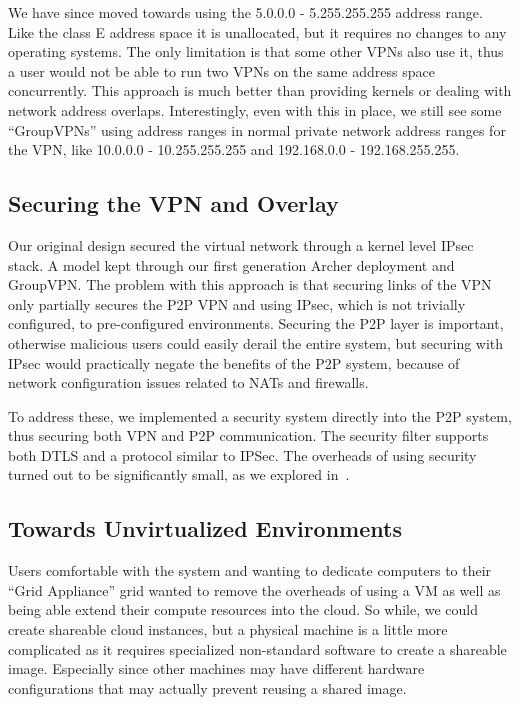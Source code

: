 \documentclass[conference]{IEEEtran}
\begin{document}
We have since moved towards using the 5.0.0.0 - 5.255.255.255 address range.
Like the class E address space it is unallocated, but it requires no changes to
any operating systems.  The only limitation is that some other VPNs also use
it, thus a user would not be able to run two VPNs on the same address space
concurrently.  This approach is much better than providing kernels or dealing
with network address overlaps.  Interestingly, even with this in place, we
still see some ``GroupVPNs''  using address ranges in normal private network
address ranges for the VPN, like 10.0.0.0 - 10.255.255.255 and 192.168.0.0 -
192.168.255.255.

\subsection{Securing the VPN and Overlay}

Our original design secured the virtual network through a kernel level IPsec
stack.  A model kept through our first generation Archer deployment and
GroupVPN.  The problem with this approach is that securing links of the VPN
only partially secures the P2P VPN and using IPsec, which is not trivially
configured, to pre-configured environments.  Securing the P2P layer is
important, otherwise malicious users could easily derail the entire system, but
securing with IPsec would practically negate the benefits of the P2P system,
because of network configuration issues related to NATs and firewalls.

To address these, we implemented a security system directly into the P2P
system, thus securing both VPN and P2P communication.  The security filter
supports both DTLS and a protocol similar to IPSec.  The overheads of using
security turned out to be significantly small, as we explored
in~\cite{bootstrapping}.

\subsection{Towards Unvirtualized Environments}

Users comfortable with the system and wanting to dedicate computers to their
``Grid Appliance'' grid wanted to remove the overheads of using a VM as well as
being able extend their compute resources into the cloud.  So while, we could
create shareable cloud instances, but a physical machine is a little more
complicated as it requires specialized non-standard software to create a
shareable image.  Especially since other machines may have different hardware
configurations that may actually prevent reusing a shared image.
\end{document}

